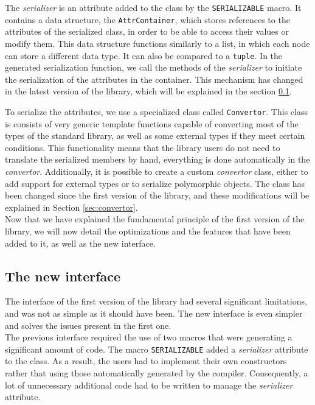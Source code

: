 The \textit{serializer} is an attribute added to the class by the
\texttt{SERIALIZABLE} macro. It contains a data structure, the
\texttt{AttrContainer}, which stores references to the attributes of the
serialized class, in order to be able to access their values or modify them.
This data structure functions similarly to a list, in which each node can store
a different data type. It can also be compared to a \texttt{tuple}. In the
generated serialization function, we call the methods of the \textit{serializer}
to initiate the serialization of the attributes in the container. This mechanism
has changed in the latest version of the library, which will be explained in the
section \ref{sec:sernewinterface}.

To serialize the attributes, we use a specialized class called
\texttt{Convertor}. This class is consists of very generic template functions
capable of converting most of the types of the standard library, as well as some
external types if they meet certain conditions. This functionality means that
the library users do not need to translate the serialized members by hand,
everything is done automatically in the \textit{convertor}. Additionally, it is
possible to create a custom \textit{convertor} class, either to add support for
external types or to serialize polymorphic objects. The class has been changed
since the first version of the library, and these modifications will be
explained in Section \ref{sec:convertor}.\\

Now that we have explained the fundamental principle of the first version of the
library, we will now detail the optimizations and the features that have been
added to it, as well as the new interface.

\subsection{The new interface}
\label{sec:sernewinterface}

The interface of the first version of the library had several significant
limitations, and was not as simple as it should have been. The new interface is
even simpler and solves the issues present in the first one.\\

The previous interface required the use of two macros that were generating a
significant amount of code. The macro \texttt{SERIALIZABLE} added a
\textit{serializer} attribute to the class. As a result, the users had to
implement their own constructors rather that using those automatically generated
by the compiler. Consequently, a lot of unnecessary additional code had to be
written to manage the \textit{serializer} attribute.

